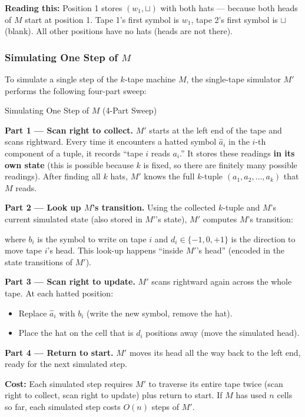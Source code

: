 
\textbf{Reading this:} Position 1 stores $(w_1, \sqcup)$ with both hats --- because both heads of $M$ start at position 1. Tape 1's first symbol is $w_1$, tape 2's first symbol is $\sqcup$ (blank). All other positions have no hats (heads are not there).

\subsubsection{Simulating One Step of $M$}

To simulate a single step of the $k$-tape machine $M$, the single-tape simulator $M'$ performs the following four-part sweep:

\begin{definitionbox}{{Simulating One Step of $M$ (4-Part Sweep)}}

\textbf{Part 1 --- Scan right to collect.} $M'$ starts at the left end of the tape and scans rightward. Every time it encounters a hatted symbol $\hat{a}_i$ in the $i$-th component of a tuple, it records ``tape $i$ reads $a_i$.'' It stores these readings \textbf{in its own state} (this is possible because $k$ is fixed, so there are finitely many possible readings). After finding all $k$ hats, $M'$ knows the full $k$-tuple $(a_1, a_2, \ldots, a_k)$ that $M$ reads.

\textbf{Part 2 --- Look up $M$'s transition.} Using the collected $k$-tuple and $M$'s current simulated state (also stored in $M'$'s state), $M'$ computes $M$'s transition:


where $b_i$ is the symbol to write on tape $i$ and $d_i \in \{-1, 0, +1\}$ is the direction to move tape $i$'s head. This look-up happens ``inside $M'$'s head'' (encoded in the state transitions of $M'$).

\textbf{Part 3 --- Scan right to update.} $M'$ scans rightward again across the whole tape. At each hatted position:
\begin{itemize}[nosep]
\item Replace $\hat{a}_i$ with $b_i$ (write the new symbol, remove the hat).
\item Place the hat on the cell that is $d_i$ positions away (move the simulated head).
\end{itemize}

\textbf{Part 4 --- Return to start.} $M'$ moves its head all the way back to the left end, ready for the next simulated step.

\textbf{Cost:} Each simulated step requires $M'$ to traverse its entire tape twice (scan right to collect, scan right to update) plus return to start. If $M$ has used $n$ cells so far, each simulated step costs $O(n)$ steps of $M'$.
\end{definitionbox}


